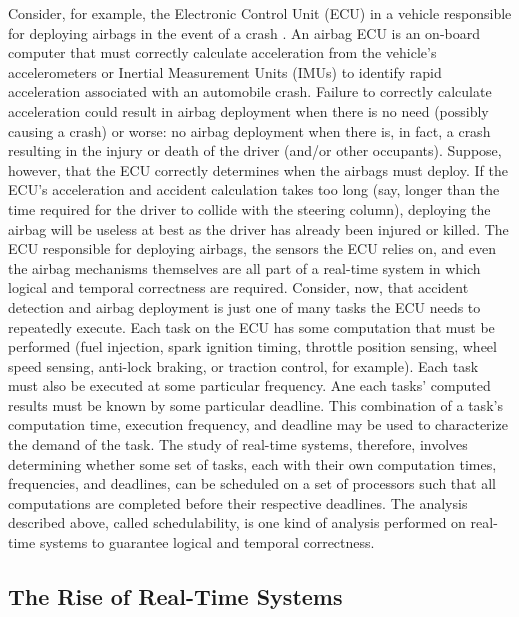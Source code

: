 Consider, for example, the Electronic Control Unit (ECU) in a vehicle responsible for deploying airbags in the event of a crash \cite{hartl_airbag_1990}.
An airbag ECU is an on-board computer that must correctly calculate acceleration from the vehicle's accelerometers or Inertial Measurement Units (IMUs) to identify rapid acceleration associated with an automobile crash.
Failure to correctly calculate acceleration could result in airbag deployment when there is no need (possibly causing a crash) or worse: no airbag deployment when there is, in fact, a crash resulting in the injury or death of the driver (and/or other occupants).
Suppose, however, that the ECU correctly determines when the airbags must deploy.
If the ECU's acceleration and accident calculation takes too long (say, longer than the time required for the driver to collide with the steering column), deploying the airbag will be useless at best as the driver has already been injured or killed.
The ECU responsible for deploying airbags, the sensors the ECU relies on, and even the airbag mechanisms themselves are all part of a real-time system in which logical and temporal correctness are required.
Consider, now, that accident detection and airbag deployment is just one of many tasks the ECU needs to repeatedly execute.
Each task on the ECU has some computation that must be performed (fuel injection, spark ignition timing, throttle position sensing, wheel speed sensing, anti-lock braking, or traction control, for example).
Each task must also be executed at some particular frequency.
Ane each tasks' computed results must be known by some particular deadline.
This combination of a task's computation time, execution frequency, and deadline may be used to characterize the demand of the task.
The study of real-time systems, therefore, involves determining whether some set of tasks, each with their own computation times, frequencies, and deadlines, can be scheduled on a set of processors such that all computations are completed before their respective deadlines.
The analysis described above, called schedulability, is one kind of analysis performed on real-time systems to guarantee logical and temporal correctness.

\subsection{The Rise of Real-Time Systems}


